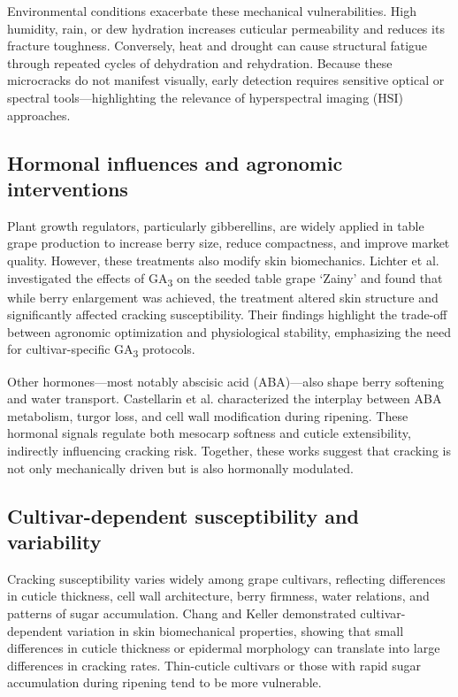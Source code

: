 \medskip
\noindent
Environmental conditions exacerbate these mechanical vulnerabilities. High humidity, rain, or dew
hydration increases cuticular permeability and reduces its fracture toughness. Conversely, heat and
drought can cause structural fatigue through repeated cycles of dehydration and rehydration.
Because these microcracks do not manifest visually, early detection requires sensitive optical or
spectral tools—highlighting the relevance of hyperspectral imaging (HSI) approaches.

\subsection{Hormonal influences and agronomic interventions}

\noindent
Plant growth regulators, particularly gibberellins, are widely applied in table grape production to
increase berry size, reduce compactness, and improve market quality. However, these treatments also
modify skin biomechanics. Lichter et al. \cite{Lichter2014} investigated the effects of GA\textsubscript{3}
on the seeded table grape ‘Zainy’ and found that while berry enlargement was achieved, the
treatment altered skin structure and significantly affected cracking susceptibility.
Their findings highlight the trade-off between agronomic optimization and physiological stability,
emphasizing the need for cultivar-specific GA\textsubscript{3} protocols.

\medskip
\noindent
Other hormones—most notably abscisic acid (ABA)—also shape berry softening and water transport.
Castellarin et al. \cite{Castellarin2016} characterized the interplay between ABA metabolism, turgor loss,
and cell wall modification during ripening. These hormonal signals regulate both mesocarp softness and
cuticle extensibility, indirectly influencing cracking risk. Together, these works suggest that cracking is not
only mechanically driven but is also hormonally modulated.

\subsection{Cultivar-dependent susceptibility and variability}

\noindent
Cracking susceptibility varies widely among grape cultivars, reflecting differences in cuticle thickness,
cell wall architecture, berry firmness, water relations, and patterns of sugar accumulation.
Chang and Keller \cite{Chang2021} demonstrated cultivar-dependent variation in skin biomechanical
properties, showing that small differences in cuticle thickness or epidermal morphology can translate into
large differences in cracking rates. Thin-cuticle cultivars or those with rapid sugar accumulation during ripening
tend to be more vulnerable.



